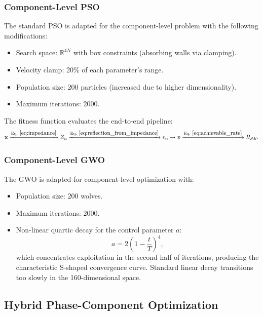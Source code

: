 \documentclass[12pt,a4paper]{article}
\newcommand{\vect}[1]{\boldsymbol{#1}}
\newcommand{\mat}[1]{\mathbf{#1}}
\begin{document}
\subsubsection{Component-Level PSO}

The standard PSO is adapted for the component-level problem with the following modifications:
\begin{itemize}
    \item Search space: $\mathbb{R}^{4N}$ with box constraints (absorbing walls via clamping).
    \item Velocity clamp: 20\% of each parameter's range.
    \item Population size: 200 particles (increased due to higher dimensionality).
    \item Maximum iterations: 2000.
\end{itemize}

The fitness function evaluates the end-to-end pipeline:
\begin{equation}
    \mat{x} \xrightarrow{\text{Eq.}~\eqref{eq:impedance}} Z_n \xrightarrow{\text{Eq.}~\eqref{eq:reflection_from_impedance}} v_n \to \vect{v} \xrightarrow{\text{Eq.}~\eqref{eq:achievable_rate}} R_{SE}.
\end{equation}

\subsubsection{Component-Level GWO}

The GWO is adapted for component-level optimization with:
\begin{itemize}
    \item Population size: 200 wolves.
    \item Maximum iterations: 2000.
    \item Non-linear quartic decay for the control parameter $a$:
    \begin{equation}
        a = 2 \left(1 - \frac{t}{T}\right)^4,
    \end{equation}
    which concentrates exploitation in the second half of iterations, producing the characteristic S-shaped convergence curve. Standard linear decay transitions too slowly in the 160-dimensional space.
\end{itemize}

\subsection{Hybrid Phase-Component Optimization}
\label{sec:hybrid}
\end{document}
